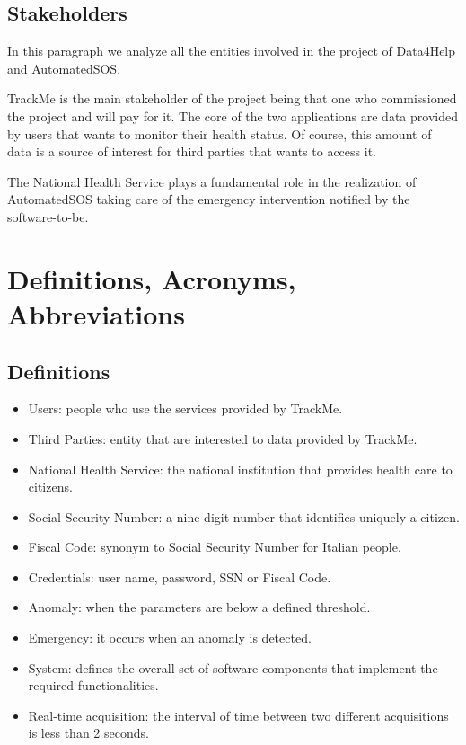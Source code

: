 \subsection{Stakeholders}
In this paragraph we analyze all the entities involved in the project of Data4Help and AutomatedSOS.
\par TrackMe is the main stakeholder of the project being that one who commissioned the project and will pay for it.
The core of the two applications are data provided by users that wants to monitor their health status.
Of course, this amount of data is a source of interest for third parties that wants to access it.
\par The National Health Service plays a fundamental role in the realization of AutomatedSOS taking care of the emergency intervention notified by the software-to-be.

\section{Definitions, Acronyms, Abbreviations}
\subsection{Definitions}
\begin{itemize}
    \item Users: people who use the services provided by TrackMe.
    \item Third Parties: entity that are interested to data provided by TrackMe.
    \item National Health Service: the national institution that provides health care to citizens.
    \item Social Security Number: a nine-digit-number that identifies uniquely a citizen.
    \item Fiscal Code: synonym to Social Security Number for Italian people.
    \item Credentials: user name, password, SSN or Fiscal Code.
    \item Anomaly: when the parameters are below a defined threshold. 
    \item Emergency: it occurs when an anomaly is detected.
    \item System: defines the overall set of software components that implement the required functionalities.
    \item Real-time acquisition: the interval of time between two different acquisitions is less than 2 seconds.
\end{itemize}

